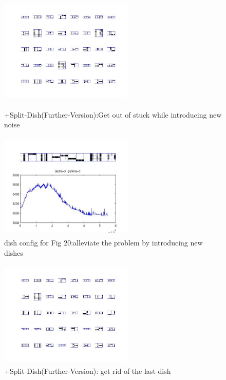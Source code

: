\documentclass{article}
\begin{document}
\begin{spacing}{1.1}
\begin{figure}[h] 
  \begin{minipage}[b]{0.5\textwidth} 
    \centering 
    \includegraphics[width=2.5in,height=2in]{init1_5_nmt85_fur1.jpg} 
    \caption{+Split-Dish(Further-Version):Get out of stuck while introducing new noise}
    \label{fig:by:table} 
  \end{minipage}%
    \begin{minipage}[b]{0.5\textwidth} 
    \centering 
    \includegraphics[width=2.5in,height=2in]{init1_5_nmt85_fur3.jpg} 
    \caption{dish config for Fig 20:alleviate the problem by introducing new dishes}
    \label{fig:by:table} 
  \end{minipage}%
\end{figure}
\begin{figure}[h] 
  \begin{minipage}[b]{0.5\textwidth} 
    \centering 
    \includegraphics[width=2.5in,height=2in]{init1_5_nmt85_fur4_re.jpg} 
    \caption{+Split-Dish(Further-Version): get rid of the last dish}

\end{minipage}
\end{figure}
\end{spacing}
\end{document}
